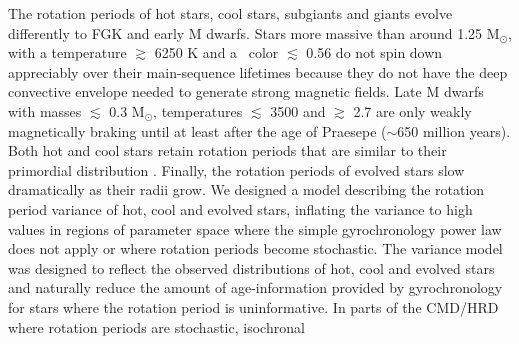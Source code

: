 The rotation periods of hot stars, cool stars, subgiants and giants evolve
differently to FGK and early M dwarfs.
Stars more massive than around 1.25 M$_\odot$, with a temperature $\gtrsim$
6250 K and a \gcolor\ color $\lesssim$ 0.56 do not spin down appreciably over
their main-sequence lifetimes because they do not have the deep convective
envelope needed to generate strong magnetic fields.
Late M dwarfs with masses $\lesssim$ 0.3 M$_\odot$, temperatures $\lesssim$
3500 and \gcolor $\gtrsim$ 2.7 are only weakly magnetically braking until at
least after the age of Praesepe ($\sim$650 million years).
Both hot and cool stars retain rotation periods that are similar to their
primordial distribution \citep[see \eg][]{matt2012, somers2017}.
Finally, the rotation periods of evolved stars slow dramatically as their
radii grow.
We designed a model describing the rotation period variance of hot, cool and
evolved stars, inflating the variance to high values in regions of parameter
space where the simple gyrochronology power law does not apply or where
rotation periods become stochastic.
The variance model was designed to reflect the observed distributions of hot,
cool and evolved stars and naturally reduce the amount of age-information
provided by gyrochronology for stars where the rotation period is
uninformative.
In parts of the CMD/HRD where rotation periods are stochastic, isochronal
